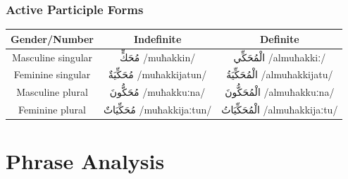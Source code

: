 \documentclass[letterpaper,12pt]{article}
\begin{document}
\subsubsection*{Active Participle Forms}
\begin{tabular}{|c|c|c|}
\hline
\textbf{Gender/Number} & \textbf{Indefinite} & \textbf{Definite} \\
\hline
Masculine singular & \textarabic{مُحَكٍّ} /muħakkin/ & \textarabic{الْمُحَكِّي} /almuħakkiː/ \\
\hline
Feminine singular & \textarabic{مُحَكِّيَةٌ} /muħakkijatun/ & \textarabic{الْمُحَكِّيَةُ} /almuħakkijatu/ \\
\hline
Masculine plural & \textarabic{مُحَكُّونَ} /muħakkuːna/ & \textarabic{الْمُحَكُّونَ} /almuħakkuːna/ \\
\hline
Feminine plural & \textarabic{مُحَكِّيَاتٌ} /muħakkijaːtun/ & \textarabic{الْمُحَكِّيَاتُ} /almuħakkijaːtu/ \\
\hline
\end{tabular}

\section{Phrase Analysis}
\end{document}
